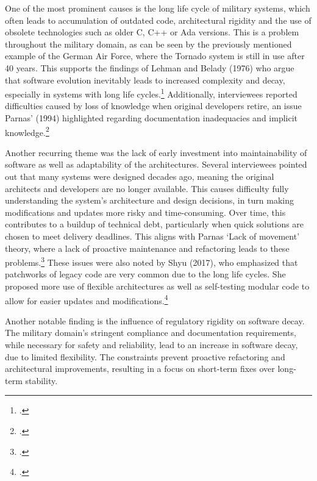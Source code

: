 One of the most prominent causes is the long life cycle of military systems, which often leads to accumulation of outdated code, architectural rigidity and the use of obsolete technologies such as older C, C++ or Ada versions.
This is a problem throughout the military domain, as can be seen by the previously mentioned example of the German Air Force, where the Tornado system is still in use after 40 years.
This supports the findings of Lehman and Belady (1976) who argue that software evolution inevitably leads to increased complexity and decay, especially in systems with long life cycles.\footcite[228]{beladyModelLargeProgram1976}
Additionally, interviewees reported difficulties caused by loss of knowledge when original developers retire, an issue Parnas' (1994) highlighted regarding documentation inadequacies and implicit knowledge.\footcite[280-281]{296790}

Another recurring theme was the lack of early investment into maintainability of software as well as adaptability of the architectures. Several interviewees pointed out that many systems were designed decades ago, meaning the original architects and developers are no longer available.
This causes difficulty fully understanding the system's architecture and design decisions, in turn making modifications and updates more risky and time-consuming. 
Over time, this contributes to a buildup of technical debt, particularly when quick solutions are chosen to meet delivery deadlines.
This aligns with Parnas `Lack of movement' theory, where a lack of proactive maintenance and refactoring leads to these problems.\footcite[280]{296790}
These issues were also noted by Shyu (2017), who emphasized that patchworks of legacy code are very common due to the long life cycles. She proposed more use of flexible architectures as well as self-testing modular code to allow for easier updates and modifications.\footcite[15-17]{shyu2017military}

Another notable finding is the influence of regulatory rigidity on software decay. The military domain's stringent compliance and documentation requirements, while necessary for safety and reliability, lead to an increase in software decay, due to limited flexibility.
The constraints prevent proactive refactoring and architectural improvements, resulting in a focus on short-term fixes over long-term stability.

